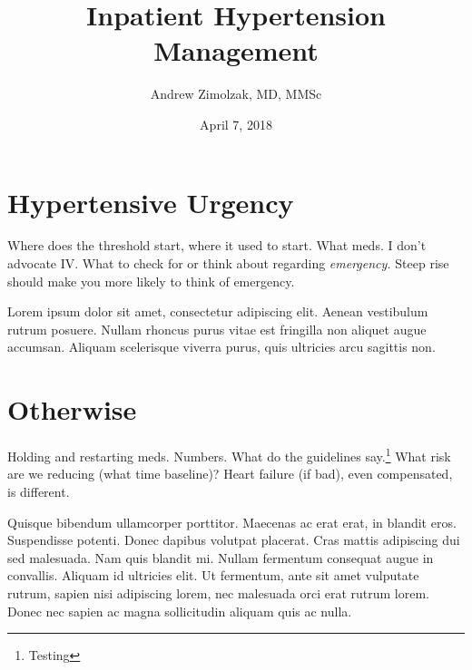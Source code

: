 \documentclass{tufte-handout}
\title{Inpatient Hypertension Management}
\author{Andrew Zimolzak, MD, MMSc}
\date{April 7, 2018}
\begin{document}
\maketitle

\section{Hypertensive Urgency}

Where does the threshold start, where it used to start. What meds. I
don't advocate IV. What to check for or think about regarding
\emph{emergency.} Steep rise should make you more likely to think of
emergency.

Lorem ipsum dolor sit amet, consectetur adipiscing elit. Aenean
vestibulum rutrum posuere. Nullam rhoncus purus vitae est fringilla
non aliquet augue accumsan. Aliquam scelerisque viverra purus, quis
ultricies arcu sagittis non.

\section{Otherwise}

Holding and restarting meds. Numbers. What do the guidelines
say.\footnote{Testing} What risk are we reducing (what time baseline)?
Heart failure (if bad), even compensated, is different.

Quisque bibendum ullamcorper porttitor. Maecenas ac erat erat, in
blandit eros. Suspendisse potenti. Donec dapibus volutpat placerat.
Cras mattis adipiscing dui sed malesuada. Nam quis blandit mi. Nullam
fermentum consequat augue in convallis. Aliquam id ultricies elit. Ut
fermentum, ante sit amet vulputate rutrum, sapien nisi adipiscing
lorem, nec malesuada orci erat rutrum lorem. Donec nec sapien ac magna
sollicitudin aliquam quis ac nulla.
\end{document}
